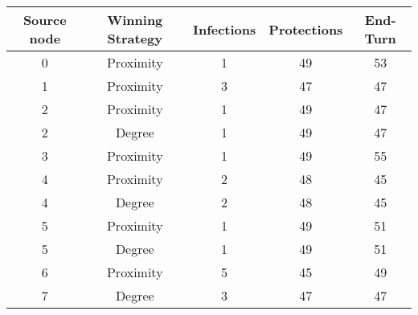 \documentclass[results.tex]{subfiles}
\begin{document}
    \begin{center}
        \begin{tabular}{| c || c | c | c | c |}
            \hline
            {\bfseries Source node} & {\bfseries Winning Strategy} & {\bfseries Infections} & {\bfseries Protections}
            & {\bfseries End-Turn}
            \\  %
            \hline\hline
            0                       & Proximity                    & 1                      & 49                      & 53                   \\
            \hline
            1                       & Proximity                    & 3                      & 47                      & 47                   \\
            \hline
            2                       & Proximity                    & 1                      & 49                      & 47                   \\
            \hline
            2                       & Degree                       & 1                      & 49                      & 47                   \\
            \hline
            3                       & Proximity                    & 1                      & 49                      & 55                   \\
            \hline
            4                       & Proximity                    & 2                      & 48                      & 45                   \\
            \hline
            4                       & Degree                       & 2                      & 48                      & 45                   \\
            \hline
            5                       & Proximity                    & 1                      & 49                      & 51                   \\
            \hline
            5                       & Degree                       & 1                      & 49                      & 51                   \\
            \hline
            6                       & Proximity                    & 5                      & 45                      & 49                   \\
            \hline
            7                       & Degree                       & 3                      & 47                      & 47                   \\

\end{tabular}
\end{center}
\end{document}
